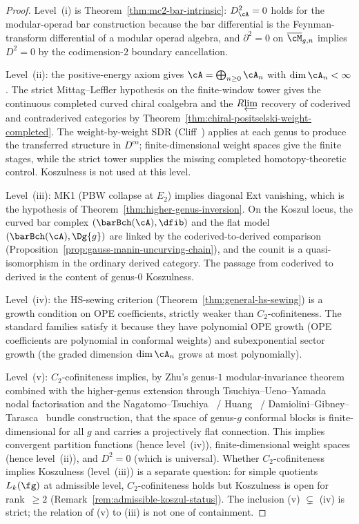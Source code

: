 \begin{proof}
Level~(i) is Theorem~\ref{thm:mc2-bar-intrinsic}: $D_\cA^2=0$ holds
for the modular-operad bar construction because the bar differential is the Feynman-transform
differential of a modular operad algebra, and $\partial^2=0$ on
$\overline{\cM}_{g,n}$ implies $D^2=0$ by the codimension-$2$
boundary cancellation.

Level~(ii): the positive-energy axiom gives
$\cA = \bigoplus_{n \geq 0} \cA_n$ with $\dim \cA_n < \infty$.
The strict Mittag--Leffler hypothesis on the finite-window tower gives
the continuous completed curved chiral coalgebra and the
$R\!\varprojlim$ recovery of coderived and contraderived categories by
Theorem~\ref{thm:chiral-positselski-weight-completed}. The
weight-by-weight SDR
(Cliff~\cite[Proposition~8.1]{Cliff19})
applies at each genus to produce the transferred structure
in $D^{\mathrm{co}}$; finite-dimensional weight spaces give the
finite stages, while the strict tower supplies the missing completed
homotopy-theoretic control. Koszulness is not used at this level.

Level~(iii): MK1 (PBW collapse at $E_2$) implies diagonal Ext
vanishing, which is the hypothesis of
Theorem~\ref{thm:higher-genus-inversion}. On the Koszul locus,
the curved bar complex $(\barBch(\cA), \dfib)$ and the flat model
$(\barBch(\cA), \Dg{g})$ are linked by the coderived-to-derived
comparison
(Proposition~\ref{prop:gauss-manin-uncurving-chain}),
and the counit is a quasi-isomorphism in the ordinary
derived category. The passage from coderived to derived is
the content of genus-$0$ Koszulness.

Level~(iv): the HS-sewing criterion
(Theorem~\ref{thm:general-hs-sewing}) is a growth condition on
OPE coefficients, strictly weaker than $C_2$-cofiniteness.
The standard families satisfy it because they have polynomial
OPE growth (OPE coefficients are polynomial in conformal
weights) and subexponential sector growth (the graded
dimension $\dim \cA_n$ grows at most polynomially).

Level~(v): $C_2$-cofiniteness implies, by Zhu's genus-$1$
modular-invariance theorem~\cite{Zhu96} combined with the
higher-genus extension through
Tsuchiya--Ueno--Yamada~\cite{TUY89} nodal factorisation and
the Nagatomo--Tsuchiya~\cite{NagatomoTsuchiya05} /
Huang~\cite{Huang05} / Damiolini--Gibney--Tarasca~\cite{DGT21}
bundle construction, that the space of genus-$g$ conformal
blocks is finite-dimensional for all $g$ and carries a
projectively flat connection. This implies convergent partition functions
(hence level~(iv)), finite-dimensional weight spaces
(hence level~(ii)), and $D^2=0$ (which is universal).
Whether $C_2$-cofiniteness implies Koszulness
\textup{(}level~\textup{(iii))} is a separate question:
for simple quotients $L_k(\fg)$ at admissible level,
$C_2$-cofiniteness holds but Koszulness is open for
rank~$\geq 2$
\textup{(}Remark~\textup{\ref{rem:admissible-koszul-status})}.
The inclusion \textup{(v)} $\subsetneq$ \textup{(iv)} is
strict; the relation of \textup{(v)} to \textup{(iii)} is
not one of containment.


\end{proof}
